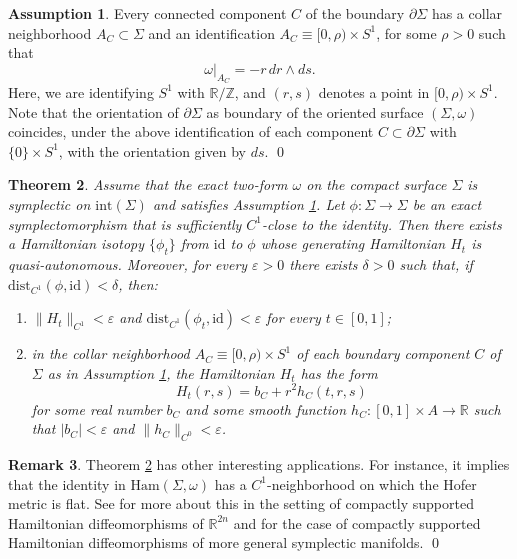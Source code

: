 \documentclass[10pt,a4paper]{article}
\let\mathds\mathbb
\let\epsilon\varepsilon
\newenvironment{enumeratei}
{\bgroup\def\theenumi{\roman{enumi}}\def\theenumii{\arabic{enumii}}\begin{enumerate}}
{\end{enumerate}\egroup}
\newtheorem{thm}{Theorem}[section]
\theoremstyle{definition}
\newtheorem{rem}[thm]{Remark}
\newtheorem{ass}[thm]{Assumption}
\newcommand{\Ham}{\mathrm{Ham}}
\newcommand{\Z}{\mathds{Z}}
\newcommand{\R}{\mathds{R}}
\begin{document}
\begin{ass}
\label{assumption}
Every connected component $C$ of the boundary $\partial \Sigma$ has a collar neighborhood $A_C\subset \Sigma$ and an identification $A_C\equiv [0,\rho) \times S^1$, for some $\rho>0$ such that
\[
\omega|_{A_C} = -r\, dr\wedge ds.
\]
Here, we are identifying $S^1$ with $\R/\Z$, and $(r,s)$ denotes a point in $[0,\rho) \times S^1$. Note that the orientation of $\partial \Sigma$ as boundary of the oriented surface $(\Sigma,\omega)$ coincides, under the above identification of each component $C\subset \partial \Sigma$ with $\{0\} \times S^1$, with the orientation given by $ds$.
\hfill\qed
\end{ass}

\begin{thm}
\label{t:quasi_autonomous}
Assume that the exact two-form $\omega$ on the compact surface $\Sigma$ is symplectic on $\mathrm{int}(\Sigma)$ and satisfies Assumption \ref{assumption}. Let $\phi:\Sigma\to\Sigma$ be an exact symplectomorphism that is sufficiently $C^1$-close to the identity. Then there exists a Hamiltonian isotopy $\{\phi_t\}$ from $\mathrm{id}$ to $\phi$ whose generating Hamiltonian $H_t$ is quasi-autonomous.
Moreover, for every $\epsilon>0$ there exists $\delta>0$ such that, if $\mathrm{dist}_{C^1}(\phi,\mathrm{id})<\delta$, then:
\begin{enumeratei}
\item\label{t:quasi_autonomousi}
$\|H_t\|_{C^1}<\epsilon$ and $\mathrm{dist}_{C^1}(\phi_t,\mathrm{id})<\epsilon$ for every $t\in [0,1]$;
\item\label{t:quasi_autonomousii}
in the collar neighborhood $A_C\equiv [0,\rho)\times S^1$ of each boundary component $C$ of~$\Sigma$ as in Assumption \ref{assumption}, the Hamiltonian $H_t$ has the form
\[
H_t(r,s) = b_C + r^2 h_C(t,r,s)
\]
for some real number $b_C$ and some smooth function $h_C: [0,1] \times A \to \R$ such that $|b_C|<\epsilon$ and $\|h_C\|_{C^0} < \epsilon$.
\end{enumeratei}
\end{thm}

\begin{rem}
Theorem \ref{t:quasi_autonomous} has other interesting applications. For instance, it implies that the identity in $\Ham(\Sigma,\omega)$ has a $C^1$-neighborhood on which the Hofer metric is flat. See \cite{Bialy:1994} for more about this in the setting of compactly supported Hamiltonian diffeomorphisms of $\R^{2n}$ and \cite{Lalonde:1995} for the case of compactly supported Hamiltonian diffeomorphisms of more general symplectic manifolds.
\hfill\qed
\end{rem}
\end{document}
